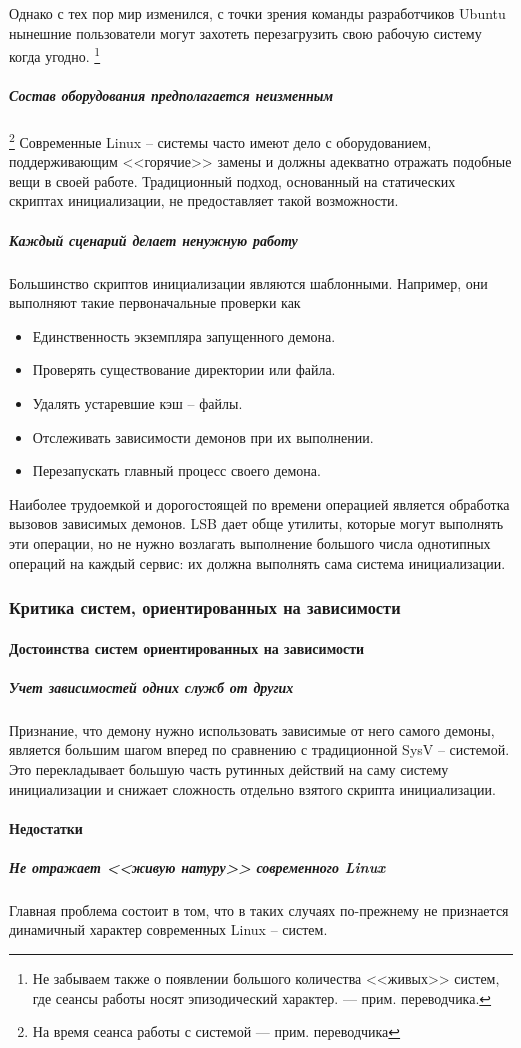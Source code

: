 Однако с тех пор мир изменился, с точки зрения команды разработчиков Ubuntu нынешние пользователи могут захотеть перезагрузить свою рабочую систему когда угодно. \footnote{Не забываем также о появлении большого количества <<живых>> систем, где сеансы работы носят эпизодический характер. --- прим. переводчика.}
\subparagraph{Состав оборудования предполагается неизменным}\footnote{На время сеанса работы с системой --- прим. переводчика}
Современные Linux -- системы часто имеют дело с оборудованием, поддерживающим <<горячие>> замены и должны адекватно отражать подобные вещи в своей работе. Традиционный подход, основанный на статических скриптах инициализации, не предоставляет такой возможности.
\subparagraph{Каждый сценарий делает ненужную работу} 
Большинство скриптов инициализации являются шаблонными. Например, они выполняют такие первоначальные проверки как \begin{itemize}
\item Единственность экземпляра запущенного демона.
\item Проверять существование директории или файла.
\item Удалять устаревшие кэш -- файлы.
\item Отслеживать зависимости демонов при их выполнении.
\item Перезапускать главный процесс своего демона.
\end{itemize}
Наиболее трудоемкой и дорогостоящей по времени операцией является обработка вызовов зависимых демонов. LSB дает обще утилиты, которые могут выполнять эти операции, но не нужно возлагать выполнение большого числа однотипных операций на каждый сервис: их должна выполнять сама система инициализации.
\subsubsection{Критика систем, ориентированных на зависимости}
\paragraph{Достоинства систем ориентированных на зависимости}
\subparagraph{Учет зависимостей одних служб от других}
Признание, что демону нужно использовать зависимые от него самого демоны, является большим шагом вперед по сравнению с традиционной SysV -- системой. Это перекладывает большую часть рутинных действий на саму систему инициализации и снижает сложность отдельно взятого скрипта инициализации.
\paragraph{Недостатки}
\subparagraph{Не отражает <<живую натуру>> современного Linux}
Главная проблема состоит в том, что в таких случаях по-прежнему не признается динамичный характер современных Linux -- систем.

